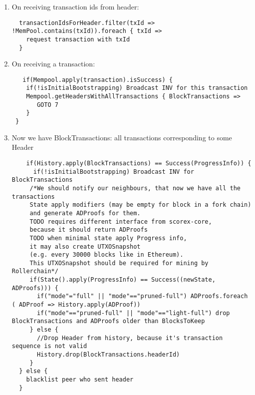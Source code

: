 \documentclass[]{article}   %
\begin{document}
\begin{enumerate}
   \item On receiving transaction ids from header:
   \begin{verbatim}
  transactionIdsForHeader.filter(txId => !MemPool.contains(txId)).foreach { txId => 
    request transaction with txId
  }
   \end{verbatim}
   \item On receiving a transaction:
   \begin{verbatim}
   if(Mempool.apply(transaction).isSuccess) {
    if(!isInitialBootstrapping) Broadcast INV for this transaction
    Mempool.getHeadersWithAllTransactions { BlockTransactions =>
       GOTO 7
    }
 }
   \end{verbatim}
   \item Now we have BlockTransactions: all transactions corresponding to some Header
   \begin{verbatim}
    if(History.apply(BlockTransactions) == Success(ProgressInfo)) {
      if(!isInitialBootstrapping) Broadcast INV for BlockTransactions
     /*We should notify our neighbours, that now we have all the transactions
     State apply modifiers (may be empty for block in a fork chain)
     and generate ADProofs for them.
     TODO requires different interface from scorex-core,
     because it should return ADProofs
     TODO when minimal state apply Progress info,
     it may also create UTXOSnapshot
     (e.g. every 30000 blocks like in Ethereum).
     This UTXOSnapshot should be required for mining by Rollerchain*/
     if(State().apply(ProgressInfo) == Success((newState, ADProofs))) {
       if("mode"="full" || "mode"=="pruned-full") ADProofs.foreach ( ADProof => History.apply(ADProof))
       if("mode"=="pruned-full" || "mode"=="light-full") drop BlockTransactions and ADProofs older than BlocksToKeep
     } else {
       //Drop Header from history, because it's transaction sequence is not valid
       History.drop(BlockTransactions.headerId)
     }
  } else {
    blacklist peer who sent header
  }
   \end{verbatim}
\end{enumerate}
\end{document}
